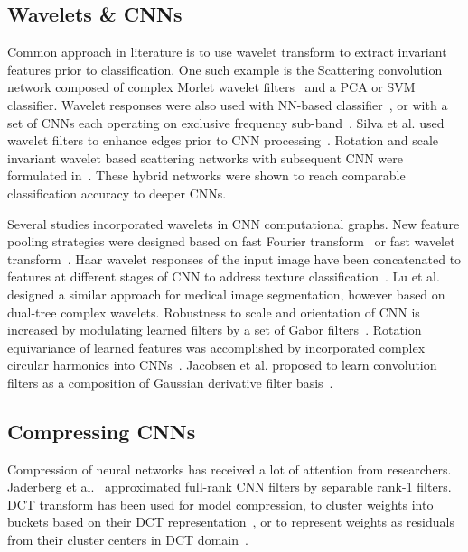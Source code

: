 \documentclass[conference]{IEEEtran}
\begin{document}
\subsection{Wavelets \& CNNs}

Common approach in literature is to use wavelet transform to extract invariant features prior to classification. One such example is the Scattering convolution network composed of complex Morlet wavelet filters~\cite{Bruna13} and a PCA or SVM classifier. Wavelet responses were also used with NN-based classifier~\cite{Said16}, or with a set of CNNs each operating on exclusive frequency sub-band~\cite{Williams16}. Silva et al. used wavelet filters to enhance edges prior to CNN processing~\cite{Silva18}.
Rotation and scale invariant wavelet based scattering networks with subsequent CNN were formulated in~\cite{Oyallon18,Singh17}. These hybrid networks were shown to reach comparable classification accuracy to deeper CNNs.  

Several studies incorporated wavelets in CNN computational graphs. New feature pooling strategies were designed based on fast Fourier transform~\cite{Rippel15} or fast wavelet transform~\cite{Williams18}. Haar wavelet responses of the input image have been concatenated to features at different stages of CNN to address texture classification~\cite{Fujieda17}. Lu et al.~\cite{Lu18} designed a similar approach for medical image segmentation, however based on dual-tree complex wavelets. Robustness to scale and orientation of CNN is increased by modulating learned filters by a set of Gabor filters~\cite{Luan18}. Rotation equivariance of learned features was accomplished by incorporated complex circular harmonics into CNNs~\cite{Worrall17}. Jacobsen et al. proposed to learn convolution filters as a composition of Gaussian derivative filter basis~\cite{Jacobsen16}.

\subsection{Compressing CNNs}

Compression of neural networks has received a lot of attention from researchers. Jaderberg et al.~\cite{Jaderberg14} approximated full-rank CNN filters by separable rank-1 filters. DCT transform has been used for model compression, to cluster weights into buckets based on their DCT representation~\cite{Chen16}, or to represent weights as residuals from their cluster centers in DCT domain~\cite{Wang16b}.
\end{document}

